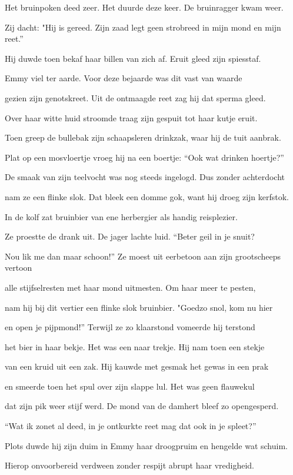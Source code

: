 Het bruinpoken deed zeer.
Het duurde deze keer.
De bruinragger kwam weer.

Zij dacht: "Hij is gereed.
Zijn zaad legt geen strobreed
in mijn mond en mijn reet.”

Hij duwde toen bekaf
haar billen van zich af.
Eruit gleed zijn spiesstaf.

Emmy viel ter aarde.
Voor deze bejaarde
was dit vast van waarde

gezien zijn genotskreet.
Uit de ontmaagde reet
zag hij dat sperma gleed.

Over haar witte huid
stroomde traag zijn gespuit
tot haar kutje eruit.

Toen greep de bullebak
zijn schaapsleren drinkzak,
waar hij de tuit aanbrak.

Plat op een mosvloertje
vroeg hij na een boertje:
“Ook wat drinken hoertje?”

De smaak van zijn teelvocht
was nog steeds ingelogd.
Dus zonder achterdocht

nam ze een flinke slok.
Dat bleek een domme gok,
want hij droeg zijn kerfstok.

In de kolf zat bruinbier
van ene herbergier
als handig reisplezier.

Ze proestte de drank uit.
De jager lachte luid.
“Beter geil in je snuit?

Nou lik me dan maar schoon!”
Ze moest uit eerbetoon
aan zijn grootscheeps vertoon

alle stijfselresten
met haar mond uitmesten.
Om haar meer te pesten,

nam hij bij dit vertier
een flinke slok bruinbier.
"Goedzo snol, kom nu hier

en open je pijpmond!”
Terwijl ze zo klaarstond
vomeerde hij terstond

het bier in haar bekje.
Het was een naar trekje.
Hij nam toen een stekje

van een kruid uit een zak.
Hij kauwde met gesmak
het gewas in een prak

en smeerde toen het spul
over zijn slappe lul.
Het was geen flauwekul

dat zijn pik weer stijf werd.
De mond van de damhert
bleef zo opengesperd.

“Wat ik zonet al deed,
in je ontkurkte reet
mag dat ook in je spleet?”

Plots duwde hij zijn duim
in Emmy haar droogpruim
en hengelde wat schuim.

Hierop onvoorbereid
verdween zonder respijt
abrupt haar vredigheid.

